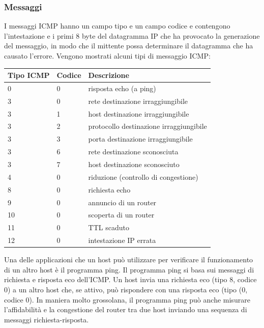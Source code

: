 \subsubsection{Messaggi}
I messaggi ICMP hanno un campo tipo e un campo codice e contengono l'intestazione e i primi 8 byte del datagramma IP che ha provocato la generazione del messaggio, in modo che il mittente possa determinare il datagramma che ha causato l'errore. Vengono mostrati alcuni tipi di messaggio ICMP:

\begin{center}
\begin{tabular}{|l|l|l|}
    \hline \textbf{Tipo ICMP} & \textbf{Codice} & \textbf{Descrizione}\\\hline
    0 & 0 & risposta echo (a ping)\\\hline
    3 & 0 & rete destinazione irraggiungibile\\\hline
    3 & 1 & host destinazione irraggiungibile\\\hline
    3 & 2 & protocollo destinazione irraggiungibile\\\hline
    3 & 3 & porta destinazione irraggiungibile\\\hline
    3 & 6 & rete destinazione sconosciuta\\\hline
    3 & 7 & host destinazione sconosciuto\\\hline
    4 & 0 & riduzione (controllo di congestione)\\\hline
    8 & 0 & richiesta echo\\\hline
    9 & 0 & annuncio di un router\\\hline
    10 & 0 & scoperta di un router\\\hline
    11 & 0 & TTL scaduto\\\hline
    12 & 0 & intestazione IP errata\\\hline
\end{tabular}
\end{center}

Una delle applicazioni che un host può utilizzare per verificare il funzionamento di un altro host è il programma ping. Il programma ping si basa sui messaggi di richiesta e risposta eco dell'ICMP. Un host invia una richiesta eco (tipo 8, codice 0) a un altro host che, se attivo, può rispondere con una risposta eco (tipo (0, codice 0). In maniera molto grossolana, il programma ping può anche misurare l'affidabilità e la congestione del router tra due host inviando una sequenza di messaggi richiesta-risposta.

